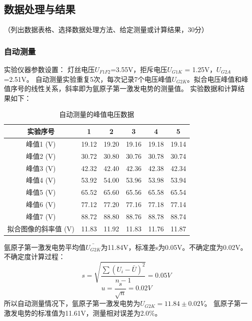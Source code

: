 \documentclass[10pt,a4paper]{ctexart}
\newcommand{\myspace}[1]{\par\vspace{#1\baselineskip}} %
\newcommand{\xiaosi}{\fontsize{12pt}{16pt}\selectfont}
\begin{document}
    \subsection{数据处理与结果}
    \xiaosi （列出数据表格、选择数据处理方法、给定测量或计算结果，30分）
\subsubsection{自动测量}
实验仪器参数设置：
灯丝电压$U_{F1F2}$=3.55V，拒斥电压$U_{G1K}$ = 1.25V，$U_{G2A}$=2.51V。
自动测量实验重复5次，每次记录7个电压峰值$U_{G2K}$。拟合电压峰值和峰值序号的线性关系，斜率即为氩原子第一激发电势的测量值。
实验数据和计算结果如下：
\begin{table}[H]
    \centering
    \begin{tabular}{|c|c|c|c|c|c|}
        \hline
        实验序号 & 1 & 2 & 3 & 4 & 5 \\
        \hline
        峰值1 (V) & 19.12 & 19.20 & 19.16 & 19.18 & 19.14 \\
        峰值2 (V) & 30.72 & 30.80 & 30.76 & 30.78 & 30.74 \\
        峰值3 (V) & 42.32 & 42.40 & 42.36 & 42.38 & 42.34 \\
        峰值4 (V) & 53.92 & 54.00 & 53.96 & 53.98 & 53.94 \\
        峰值5 (V) & 65.52 & 65.60 & 65.56 & 65.58 & 65.54 \\
        峰值6 (V) & 77.12 & 77.20 & 77.16 & 77.18 & 77.14 \\
        峰值7 (V) & 88.72 & 88.80 & 88.76 & 88.78 & 88.74 \\
        \hline
        拟合图像的斜率值 (V) & 11.83 & 11.92 & 11.83 & 11.76 & 11.87 \\
        \hline
    \end{tabular}
    \caption{自动测量的峰值电压数据}
\end{table}
氩原子第一激发电势平均值$\bar{U_{G2K}}$为11.84V，标准差s为0.05V。不确定度为0.02V。
不确定度计算过程：
\begin{equation*}
    s = \sqrt{\frac{\sum (U_i - \bar{U})^2}{n-1}} = 0.05V
\end{equation*}
\begin{equation*}
    u = \frac{s}{\sqrt{n}} = 0.02V
\end{equation*}
所以自动测量情况下，氩原子第一激发电势为$U_{G2K} = 11.84 \pm 0.02V$。
氩原子第一激发电势的标准值为11.61V，测量相对误差为2.0\%。
\myspace{2}
\end{document}
